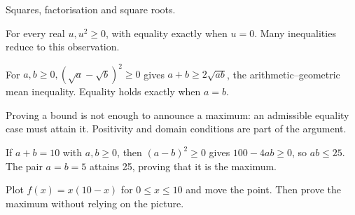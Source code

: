 \documentclass[11pt]{article}
\begin{document}
Squares, factorisation and square roots.\par
{}
For every real \(u, u^{2}\geq 0\), with equality exactly when \(u=0\). Many inequalities reduce to this observation.\par
For \(a,b\geq 0, (\sqrt{a}-\sqrt{b})^{2}\geq 0\) gives \(a+b\geq 2\sqrt{ab}\), the arithmetic--geometric mean inequality. Equality holds exactly when \(a=b\).\par
Proving a bound is not enough to announce a maximum: an admissible equality case must attain it. Positivity and domain conditions are part of the argument.\par
{}
If \(a+b=10\) with \(a,b\geq 0\), then \((a-b)^{2}\geq 0\) gives \(100-4ab\geq 0\), so \(ab\leq 25\). The pair \(a=b=5\) attains 25, proving that it is the maximum.\par
{}
Plot \(f(x)=x(10-x)\) for \(0\leq x\leq 10\) and move the point. Then prove the maximum without relying on the picture.\par
\end{document}
